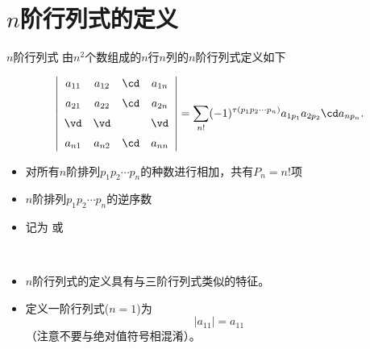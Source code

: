 \section{$n$阶行列式的定义}



\begin{frame}

  \begin{overprint}
    \begin{center}
      \vspace{0.5cm}
    \end{center}
  \end{overprint}
  
  \begin{overprint}
    \begin{block}{$n$阶行列式}
      由$n^2$个数组成的$n$行$n$列的$n$阶行列式定义如下
      \begin{footnotesize}
        $$
        \left|
        \begin{array}{ccccc}
          a_{11} & a_{12} & \cd & a_{1n} \\[0.2cm]
          a_{21} & a_{22} & \cd & a_{2n} \\[0.2cm]
          \vd   &  \vd  &     & \vd   \\[0.2cm]
          a_{n1} & a_{n2} & \cd & a_{nn} 
        \end{array}
        \right|
        = \sum_{n!} (-1)^{\tau(p_1p_2\cdots p_n)} a_{1p_1}a_{2p_2}\cd a_{np_n}.
        $$
      \end{footnotesize}
    \end{block}

    \begin{itemize}
    \item {} 对所有$n$阶排列$p_1p_2\cdots p_n$的种数进行相加，共有$P_n=n!$项\\[0.3cm]
    \item {} $n$阶排列$p_1p_2\cdots p_n$的逆序数 \\[0.3cm]
    \item 记为 或  \\[0.3cm]
    \end{itemize}
    

     \\
    \begin{itemize}
    \item 
      $n$阶行列式的定义具有与三阶行列式类似的特征。\\[0.3cm]
    \item
      定义一阶行列式($n=1$)为
      $$
      |a_{11}|=a_{11}
      $$
      （注意不要与绝对值符号相混淆）。
    \end{itemize}
  \end{overprint}
\end{frame}

